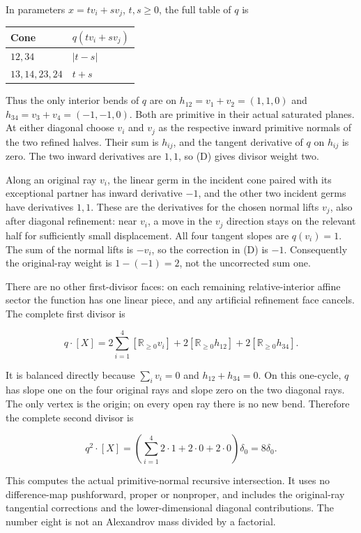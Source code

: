 \documentclass[
  10pt,
]{article}
\begin{document}
In parameters \(x=t v_i+s v_j\), \(t,s\geq0\), the full table of \(q\)
is

\begin{longtable}[]{@{}ll@{}}
\toprule\noalign{}
Cone & \(q(t v_i+s v_j)\) \\
\midrule\noalign{}
\endhead
\bottomrule\noalign{}
\endlastfoot
\(12,34\) & \(\lvert t-s\rvert\) \\
\(13,14,23,24\) & \(t+s\) \\
\end{longtable}

Thus the only interior bends of \(q\) are on \(h_{12}=v_1+v_2=(1,1,0)\)
and \(h_{34}=v_3+v_4=(-1,-1,0)\). Both are primitive in their actual
saturated planes. At either diagonal choose \(v_i\) and \(v_j\) as the
respective inward primitive normals of the two refined halves. Their sum
is \(h_{ij}\), and the tangent derivative of \(q\) on \(h_{ij}\) is
zero. The two inward derivatives are \(1,1\), so (D) gives divisor
weight two.

Along an original ray \(v_i\), the linear germ in the incident cone
paired with its exceptional partner has inward derivative \(-1\), and
the other two incident germs have derivatives \(1,1\). These are the
derivatives for the chosen normal lifts \(v_j\), also after diagonal
refinement: near \(v_i\), a move in the \(v_j\) direction stays on the
relevant half for sufficiently small displacement. All four tangent
slopes are \(q(v_i)=1\). The sum of the normal lifts is \(-v_i\), so the
correction in (D) is \(-1\). Consequently the original-ray weight is
\(1-(-1)=2\), not the uncorrected sum one.

There are no other first-divisor faces: on each remaining
relative-interior affine sector the function has one linear piece, and
any artificial refinement face cancels. The complete first divisor is

\[
q\cdot[X]=2\sum_{i=1}^4[\mathbb R_{\geq0}v_i]
+2[\mathbb R_{\geq0}h_{12}]+2[\mathbb R_{\geq0}h_{34}]. \tag{Q1}
\]

It is balanced directly because \(\sum_i v_i=0\) and
\(h_{12}+h_{34}=0\). On this one-cycle, \(q\) has slope one on the four
original rays and slope zero on the two diagonal rays. The only vertex
is the origin; on every open ray there is no new bend. Therefore the
complete second divisor is

\[
q^2\cdot[X]=\left(\sum_{i=1}^4 2\cdot1+2\cdot0+2\cdot0\right)\delta_0
=8\delta_0. \tag{Q2}
\]

This computes the actual primitive-normal recursive intersection. It
uses no difference-map pushforward, proper or nonproper, and includes
the original-ray tangential corrections and the lower-dimensional
diagonal contributions. The number eight is not an Alexandrov mass
divided by a factorial.
\end{document}
